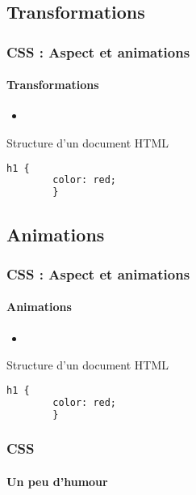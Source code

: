 \documentclass[xcolor=table]{beamer}
\begin{document}
\subsection{Transformations}

\begin{frame}[fragile]
\frametitle{CSS : Aspect et animations}
\framesubtitle{Transformations}

\begin{minipage}{0.60\textwidth}
	\begin{itemize}
		\item 
	\end{itemize}
\end{minipage}
%
\begin{minipage}{0.38\textwidth}
	\begin{exampleblock}{Structure d'un document HTML}
		\lstset{escapeinside=**}
		\scriptsize\bfseries
		\begin{lstlisting}[language={html}]
		h1 {
		color: red;
		}
		\end{lstlisting}
	\end{exampleblock}
\end{minipage}
\end{frame}

\subsection{Animations}

\begin{frame}[fragile]
\frametitle{CSS : Aspect et animations}
\framesubtitle{Animations}

\begin{minipage}{0.60\textwidth}
	\begin{itemize}
		\item 
	\end{itemize}
\end{minipage}
%
\begin{minipage}{0.38\textwidth}
	\begin{exampleblock}{Structure d'un document HTML}
		\lstset{escapeinside=**}
		\scriptsize\bfseries
		\begin{lstlisting}[language={html}]
		h1 {
		color: red;
		}
		\end{lstlisting}
	\end{exampleblock}
\end{minipage}
\end{frame}


\begin{frame}
\frametitle{CSS}
\framesubtitle{Un peu d'humour}

\begin{center}
\end{center}

\end{frame}

\end{document}
